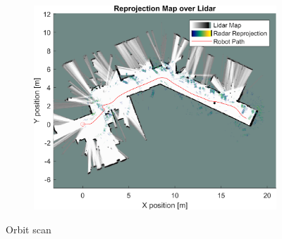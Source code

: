 \begin{figure}[htbp]
\begin{subfigure}[t]{0.475\linewidth}
    \end{subfigure}%
    \hfill%
    \begin{subfigure}[t]{0.475\linewidth}
        \centering
        \includegraphics[width=\linewidth,max height=.475\textheight]{gfx/results/orbit_map.png}
    \end{subfigure}%
    \caption{Orbit scan}
\end{figure}

